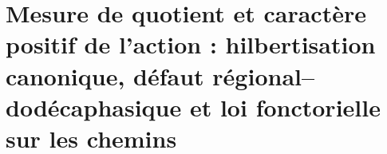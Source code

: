 \chapter{Mesure de quotient et caractère positif de l’action : hilbertisation canonique, défaut régional--dodécaphasique et loi fonctorielle sur les chemins}
\label{chap:p3-final:35:medida_accion_positiva}

